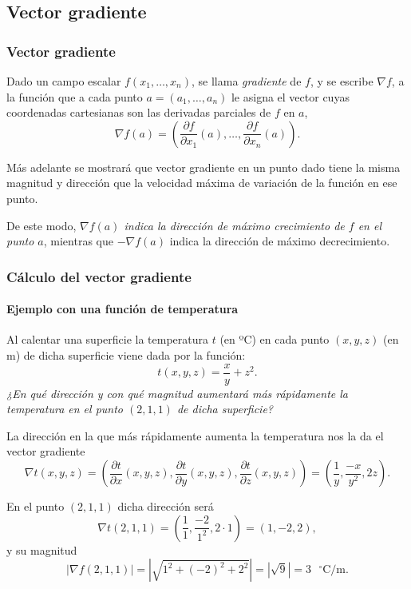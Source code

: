 \subsection{Vector gradiente}
\begin{frame}
\frametitle{Vector gradiente}
\begin{definicion}
Dado un campo escalar $f(x_1,\ldots,x_n)$, se llama \emph{gradiente} de $f$, y se escribe $\nabla f$, a la función que a
cada punto $a=(a_1,\ldots,a_n)$ le asigna el vector cuyas coordenadas cartesianas son las derivadas parciales de $f$ en
$a$,
\[
\nabla f(a)=\left(\frac{\partial f}{\partial x_1}(a),\ldots,\frac{\partial f}{\partial x_n}(a)\right).
\]
\end{definicion}

Más adelante se mostrará que vector gradiente en un punto dado tiene la misma magnitud y dirección que la velocidad máxima de variación de la
función en ese punto. 

De este modo, \alert{\emph{$\nabla f(a)$ indica la dirección de máximo crecimiento de $f$ en el punto $a$}}, mientras que $- \nabla f(a)$ indica la dirección de máximo decrecimiento.
\end{frame}



\begin{frame}
\frametitle{Cálculo del vector gradiente}
\framesubtitle{Ejemplo con una función de temperatura}
Al calentar una superficie la temperatura $t$ (en ºC) en cada punto $(x,y,z)$ (en m) de dicha superficie viene dada por
la función:
\[ 
t(x,y,z)=\frac{x}{y}+z^2. 
\]
\emph{¿En qué dirección y con qué magnitud aumentará más rápidamente la temperatura en el punto $(2,1,1)$ de dicha superficie?}


La dirección en la que más rápidamente aumenta la temperatura nos la da el vector gradiente 
\[
\nabla t(x,y,z)=\left(\frac{\partial t}{\partial x}(x,y,z),\frac{\partial t}{\partial y}(x,y,z),\frac{\partial t}{\partial
z}(x,y,z)\right)=\left(\frac{1}{y},\frac{-x}{y^2},2z\right).
\]

En el punto $(2,1,1)$ dicha dirección será
\[
\nabla t(2,1,1)=\left(\frac{1}{1},\frac{-2}{1^2},2\cdot 1\right)=(1,-2,2),
\]
y su magnitud 
\[
|\nabla f(2,1,1)|=|\sqrt{1^2+(-2)^2+2^2}|=|\sqrt{9}|=3 \mbox{ $^\circ$C/m}.
\]
\end{frame}



